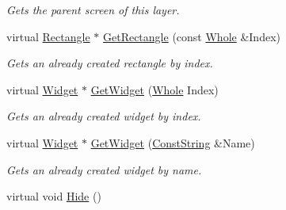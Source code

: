 \begin{DoxyCompactItemize}
\begin{DoxyCompactList}\small\item\em Gets the parent screen of this layer. \item\end{DoxyCompactList}\item 
virtual \hyperlink{classphys_1_1UI_1_1Rectangle}{Rectangle} $\ast$ \hyperlink{classphys_1_1UI_1_1Layer_ac96bb33f2c47d3ab1b615fc91aa5ad91}{GetRectangle} (const \hyperlink{namespacephys_a460f6bc24c8dd347b05e0366ae34f34a}{Whole} \&Index)
\begin{DoxyCompactList}\small\item\em Gets an already created rectangle by index. \item\end{DoxyCompactList}\item 
virtual \hyperlink{classphys_1_1UI_1_1Widget}{Widget} $\ast$ \hyperlink{classphys_1_1UI_1_1Layer_a8506cbb9fda26895300e4ade376754ab}{GetWidget} (\hyperlink{namespacephys_a460f6bc24c8dd347b05e0366ae34f34a}{Whole} Index)
\begin{DoxyCompactList}\small\item\em Gets an already created widget by index. \item\end{DoxyCompactList}\item 
virtual \hyperlink{classphys_1_1UI_1_1Widget}{Widget} $\ast$ \hyperlink{classphys_1_1UI_1_1Layer_a4340e70c9ab4083236d4a4c8d804c62a}{GetWidget} (\hyperlink{namespacephys_a5ce5049f8b4bf88d6413c47b504ebb31}{ConstString} \&Name)
\begin{DoxyCompactList}\small\item\em Gets an already created widget by name. \item\end{DoxyCompactList}\item 
\hypertarget{classphys_1_1UI_1_1Layer_ad69fc503170e52b2248f76a87f57a2b8}{
virtual void \hyperlink{classphys_1_1UI_1_1Layer_ad69fc503170e52b2248f76a87f57a2b8}{Hide} ()}
\label{classphys_1_1UI_1_1Layer_ad69fc503170e52b2248f76a87f57a2b8}


\end{DoxyCompactItemize}
